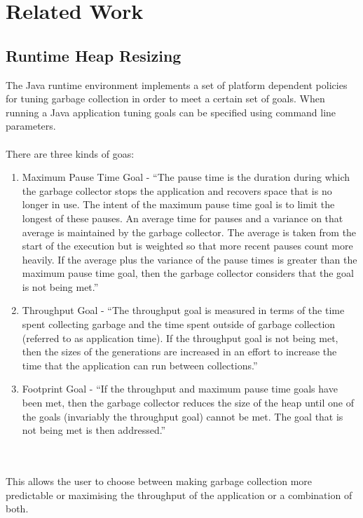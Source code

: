 \documentclass{l4proj}
\begin{document}
\section{Related Work}
\subsection{Runtime Heap Resizing}
\hspace*{3em} The Java runtime environment implements a set of platform dependent policies for tuning garbage collection in order to meet a certain set of goals. When running a Java application tuning goals can be specified using command line parameters. 
\\\\
There are three kinds of goas:
\begin{enumerate}
\item Maximum Pause Time Goal - ``The pause time is the duration during which the garbage collector stops the application and recovers space that is no longer in use. The intent of the maximum pause time goal is to limit the longest of these pauses. An average time for pauses and a variance on that average is maintained by the garbage collector. The average is taken from the start of the execution but is weighted so that more recent pauses count more heavily. If the average plus the variance of the pause times is greater than the maximum pause time goal, then the garbage collector considers that the goal is not being met.''
\item Throughput Goal - ``The throughput goal is measured in terms of the time spent collecting garbage and the time spent outside of garbage collection (referred to as application time). If the throughput goal is not being met, then the sizes of the generations are increased in an effort to increase the time that the application can run between collections.''
\item Footprint Goal - ``If the throughput and maximum pause time goals have been met, then the garbage collector reduces the size of the heap until one of the goals (invariably the throughput goal) cannot be met. The goal that is not being met is then addressed.''
\end{enumerate}\cite{ergonomics}
\\\\
This allows the user to choose between making garbage collection more predictable or maximising the throughput of the application or a combination of both. 
\end{document}
